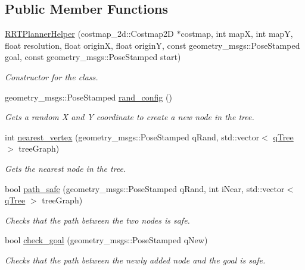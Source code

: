 \subsection*{Public Member Functions}
\begin{DoxyCompactItemize}
\item 
\hyperlink{classRRTPlannerHelper_af99e3fe000e73de8256f59d89c592e96}{R\+R\+T\+Planner\+Helper} (costmap\+\_\+2d\+::\+Costmap2D $\ast$costmap, int mapX, int mapY, float resolution, float originX, float originY, const geometry\+\_\+msgs\+::\+Pose\+Stamped goal, const geometry\+\_\+msgs\+::\+Pose\+Stamped start)
\begin{DoxyCompactList}\small\item\em Constructor for the class. \end{DoxyCompactList}\item 
geometry\+\_\+msgs\+::\+Pose\+Stamped \hyperlink{classRRTPlannerHelper_aae3ca3af6424a1014af42db124e5cd4a}{rand\+\_\+config} ()
\begin{DoxyCompactList}\small\item\em Gets a random X and Y coordinate to create a new node in the tree. \end{DoxyCompactList}\item 
int \hyperlink{classRRTPlannerHelper_a939aa6f8a7eeb2142cc554a8790614bd}{nearest\+\_\+vertex} (geometry\+\_\+msgs\+::\+Pose\+Stamped q\+Rand, std\+::vector$<$ \hyperlink{structRRTPlannerHelper_1_1qTree}{q\+Tree} $>$ tree\+Graph)
\begin{DoxyCompactList}\small\item\em Gets the nearest node in the tree. \end{DoxyCompactList}\item 
bool \hyperlink{classRRTPlannerHelper_a4beec66805ee1ddd248b34054d62e3eb}{path\+\_\+safe} (geometry\+\_\+msgs\+::\+Pose\+Stamped q\+Rand, int i\+Near, std\+::vector$<$ \hyperlink{structRRTPlannerHelper_1_1qTree}{q\+Tree} $>$ tree\+Graph)
\begin{DoxyCompactList}\small\item\em Checks that the path between the two nodes is safe. \end{DoxyCompactList}\item 
bool \hyperlink{classRRTPlannerHelper_aebf2950bb391ab168ac677f56c851575}{check\+\_\+goal} (geometry\+\_\+msgs\+::\+Pose\+Stamped q\+New)
\begin{DoxyCompactList}\small\item\em Checks that the path between the newly added node and the goal is safe. \end{DoxyCompactList}\item 

\end{DoxyCompactItemize}
